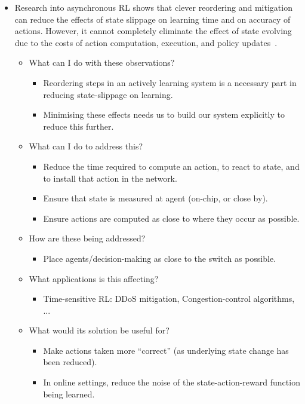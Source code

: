 \documentclass[sigconf,natbib=false]{acmart}
\begin{document}
\begin{itemize}
	\item Research into asynchronous RL shows that clever reordering and mitigation can reduce the effects of state slippage on learning time and on accuracy of actions. However, it cannot completely eliminate the effect of state evolving due to the costs of action computation, execution, and policy updates~\cite{DBLP:journals/firai/TravnikMSP18}.
	\begin{itemize}
		\item What can I do with these observations?
		\begin{itemize}
			\item Reordering steps in an actively learning system is a necessary part in reducing state-slippage on learning.
			\item Minimising these effects needs us to build our system explicitly to reduce this further.
		\end{itemize}
		\item What can I do to address this?
		\begin{itemize}
			\item Reduce the time required to compute an action, to react to state, and to install that action in the network.
			\item Ensure that state is measured at agent (on-chip, or close by).
			\item Ensure actions are computed as close to where they occur as possible.
		\end{itemize}
		\item How are these being addressed?
		\begin{itemize}
			\item Place agents/decision-making as close to the switch as possible.
		\end{itemize}
		\item What applications is this affecting?
		\begin{itemize}
			\item Time-sensitive RL: DDoS mitigation, Congestion-control algorithms, ...
		\end{itemize}
		\item What would its solution be useful for?
		\begin{itemize}
			\item Make actions taken more ``correct'' (as underlying state change has been reduced).
			\item In online settings, reduce the noise of the state-action-reward function being learned.
		\end{itemize}
	\end{itemize}
	

\end{itemize}
\end{document}
